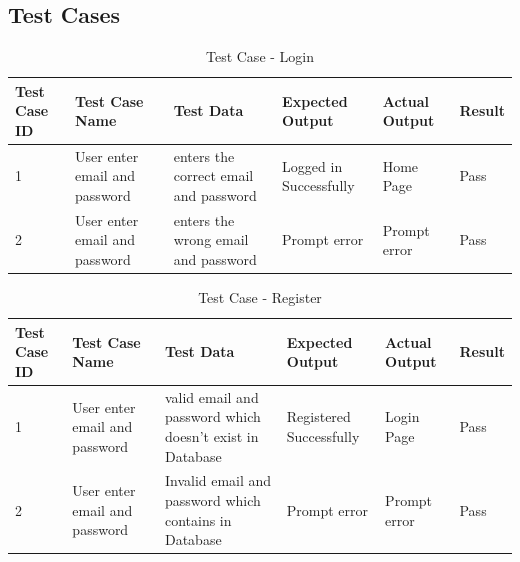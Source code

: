 \documentclass{article}
\begin{document}
\begin{flushleft}
\begin{figure}[!h]
\end{figure}
\newpage
        
        \subsection{Test Cases}
        \begin{center}
           \begin{table}[!ht]
           \renewcommand\thetable{5.2.1}
               \centering
               \caption{Test Case - Login}
               \label{"""}
              \begin{tabular}{ | m{1cm}| m{2cm}| m{2cm}| m{2cm}| m{2cm} | m{1cm} | }
           
            \hline
             Test Case ID & Test Case Name & Test Data & Expected Output & Actual Output & Result  \\ \hline
             1 & User enter email and password & enters the correct email and password & Logged in Successfully & Home Page & Pass  \\  \hline
             2 & User enter email and password & enters the wrong email and password & Prompt error & Prompt error & Pass  \\  \hline
            \end{tabular}
           \end{table}
           \end{center}
           
           \begin{center}
           \begin{table}[!ht]
           \renewcommand\thetable{5.2.2}
               \centering
               \caption{Test Case - Register}
               \label{"""""}
              \begin{tabular}{ | p{1cm}| p{2cm}| p{2cm}| p{2cm}| p{2cm} | p{1cm} | }
           
            \hline
             Test Case ID & Test Case Name & Test Data & Expected Output & Actual Output & Result  \\ \hline
             1 & User enter email and password & valid email and password which doesn't exist in Database & Registered Successfully & Login Page & Pass  \\  \hline
             2 & User enter email and password & Invalid email and password which contains in Database &  Prompt error & Prompt error & Pass  \\  \hline
            \end{tabular}
           \end{table}
           \end{center}
            

\end{flushleft}
\end{document}

